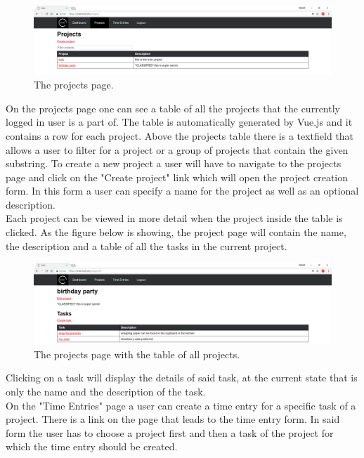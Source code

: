 \documentclass[a4paper, 12pt, headsepline]{scrartcl}
\begin{document}
\begin{figure}[h]
    \includegraphics[width=\textwidth]{trckr-projects-table}
    \caption{The projects page.}
    \label{fig:trckr-projects-table}
\end{figure}

On the projects page one can see a table of all the projects that the currently
logged in user is a part of. The table is automatically generated by Vue.js and
it contains a row for each project. Above the projects table there is a
textfield that allows a user to filter for a project or a group of projects that
contain the given substring. To create a new project a user will have to
navigate to the projects page and click on the "Create project" link which will
open the project creation form. In this form a user can specify a name for the
project as well as an optional description.\\
Each project can be viewed in more detail when the project inside the table is
clicked. As the figure below is showing, the project page will contain the name,
the description and a table of all the tasks in the current project.

\begin{figure}[h]
    \includegraphics[width=\textwidth]{trckr-project-page}
    \caption{The projects page with the table of all projects.}
    \label{fig:trckr-project-page}
\end{figure}

Clicking on a task will display the details of said task, at the current state
that is only the name and the description of the task.\\
On the "Time Entries" page a user can create a time entry for a specific task of
a project. There is a link on the page that leads to the time entry form. In
said form the user has to choose a project first and then a task of the project
for which the time entry should be created.
\end{document}
